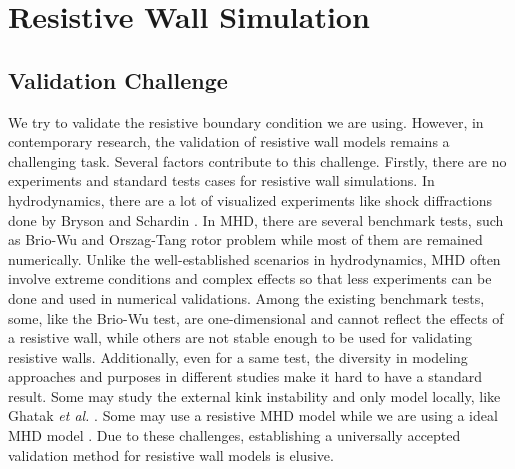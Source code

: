 
\chapter{Resistive Wall Simulation}  %

\ifpdf
    \graphicspath{{Chapter8/Figs/Raster/}{Chapter8/Figs/PDF/}{Chapter8/Figs/}}
\else
    \graphicspath{{Chapter8/Figs/Vector/}{Chapter8/Figs/}}
\fi

\label{chapter 8}


\section{Validation Challenge}
We try to validate the resistive boundary condition we are using. However, in contemporary research, the validation of resistive wall models remains a challenging task. Several factors contribute to this challenge. Firstly, there are no experiments and standard tests cases for resistive wall simulations. In hydrodynamics, there are a lot of visualized experiments like shock diffractions done by Bryson \cite{bryson1961diffraction} and Schardin \cite{schardin1966stossrohre}. In MHD, there are several benchmark tests, such as Brio-Wu and Orszag-Tang rotor problem while most of them are remained numerically. Unlike the well-established scenarios in hydrodynamics, MHD often involve extreme conditions and complex effects \cite{pu2024unified} so that less experiments can be done and used in numerical validations. Among the existing benchmark tests, some, like the Brio-Wu test, are one-dimensional and cannot reflect the effects of a resistive wall, while others are not stable enough to be used for validating resistive walls. Additionally, even for a same test, the diversity in modeling approaches and purposes in different studies make it hard to have a standard result. Some may study the external kink instability and only model locally, like  Ghatak \textit{et al.} \cite{ghatak2007kink}. Some may use a resistive MHD model while we are using a ideal MHD model \cite{becerra2016resistive}. Due to these challenges, establishing a universally accepted validation method for resistive wall models is elusive. 

